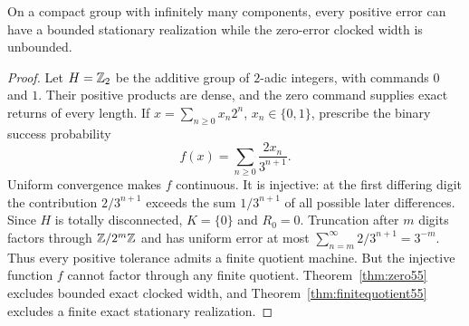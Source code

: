 \begin{proposition}\label{prop:adic55}
On a compact group with infinitely many components, every positive error can have a bounded stationary realization while the zero-error clocked width is unbounded.
\end{proposition}
\begin{proof}
Let $H=\mathbb Z_2$ be the additive group of $2$-adic integers, with commands $0$ and $1$. Their positive products are dense, and the zero command supplies exact returns of every length. If $x=\sum_{n\ge0}x_n2^n$, $x_n\in\{0,1\}$, prescribe the binary success probability
\[
                         f(x)=\sum_{n\ge0}\frac{2x_n}{3^{n+1}}.
\]
Uniform convergence makes $f$ continuous. It is injective: at the first differing digit the contribution $2/3^{n+1}$ exceeds the sum $1/3^{n+1}$ of all possible later differences. Since $H$ is totally disconnected, $K=\{0\}$ and $R_0=0$. Truncation after $m$ digits factors through $\mathbb Z/2^m\mathbb Z$ and has uniform error at most $\sum_{n=m}^\infty2/3^{n+1}=3^{-m}$. Thus every positive tolerance admits a finite quotient machine. But the injective function $f$ cannot factor through any finite quotient. Theorem~\ref{thm:zero55} excludes bounded exact clocked width, and Theorem~\ref{thm:finitequotient55} excludes a finite exact stationary realization.
\end{proof}

